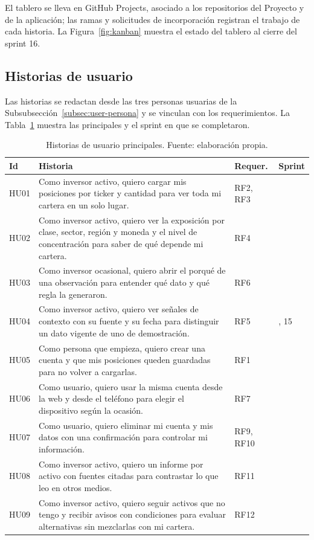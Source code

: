 El tablero se lleva en GitHub Projects, asociado a los repositorios del Proyecto y de la aplicación; las ramas y solicitudes de incorporación registran el trabajo de cada historia. La Figura~\ref{fig:kanban} muestra el estado del tablero al cierre del sprint 16.


\subsection{Historias de usuario}\label{subsec:historias}

Las historias se redactan desde las tres personas usuarias de la Subsubsección~\ref{subsec:user-persona} y se vinculan con los requerimientos. La Tabla~\ref{tab:historias} muestra las principales y el sprint en que se completaron.
\begin{table}[ht]
\centering\small\renewcommand{\arraystretch}{1.15}
\caption{Historias de usuario principales. Fuente: elaboración propia.}\label{tab:historias}
\begin{tabular}{>{\raggedright\arraybackslash}p{1.1cm}>{\raggedright\arraybackslash}p{8.6cm}>{\raggedright\arraybackslash}p{1.6cm}>{\raggedright\arraybackslash}p{1.5cm}}\hline
\textbf{Id} & \textbf{Historia} & \textbf{Requer.} & \textbf{Sprint}\\\hline
HU01 & Como inversor activo, quiero cargar mis posiciones por ticker y cantidad para ver toda mi cartera en un solo lugar. & RF2, RF3 & 11\\
HU02 & Como inversor activo, quiero ver la exposición por clase, sector, región y moneda y el nivel de concentración para saber de qué depende mi cartera. & RF4 & 11\\
HU03 & Como inversor ocasional, quiero abrir el porqué de una observación para entender qué dato y qué regla la generaron. & RF6 & 11\\
HU04 & Como inversor activo, quiero ver señales de contexto con su fuente y su fecha para distinguir un dato vigente de uno de demostración. & RF5 & 11, 15\\
HU05 & Como persona que empieza, quiero crear una cuenta y que mis posiciones queden guardadas para no volver a cargarlas. & RF1 & 12\\
HU06 & Como usuario, quiero usar la misma cuenta desde la web y desde el teléfono para elegir el dispositivo según la ocasión. & RF7 & 15\\
HU07 & Como usuario, quiero eliminar mi cuenta y mis datos con una confirmación para controlar mi información. & RF9, RF10 & 15\\
HU08 & Como inversor activo, quiero un informe por activo con fuentes citadas para contrastar lo que leo en otros medios. & RF11 & 15\\
HU09 & Como inversor activo, quiero seguir activos que no tengo y recibir avisos con condiciones para evaluar alternativas sin mezclarlas con mi cartera. & RF12 & 16\\\hline
\end{tabular}
\end{table}

